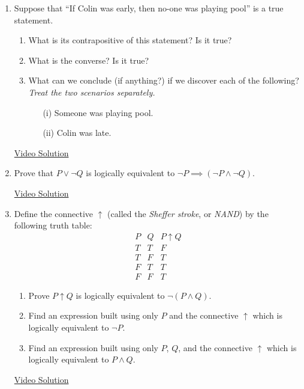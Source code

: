 \begin{enumerate}\renewcommand{\labelenumi}{\thesubsection.\theenumi} 
  \item Suppose that ``If Colin was early, then no-one was playing pool'' is a true statement.\prelistskip
		\begin{enumerate}
	  	\item What is its contrapositive of this statement? Is it true?
	  	\item What is the converse? Is it true?
	  	\item What can we conclude (if anything?) if we discover each of the following? \emph{Treat the two scenarios separately.}
			\begin{enumerate}
	  	  \item[(i)] Someone was playing pool.
	      \item[(ii)] Colin was late.
			\end{enumerate}
		\end{enumerate}
		
		\href{https://youtu.be/BI_M1-OoMac}{Video Solution}
  
  \item Prove that $P \lor \neg Q$ is logically equivalent to $\neg P \implies (\neg P \land \neg Q)$.
  
  \href{https://youtu.be/NrbdGXAP6Ug}{Video Solution}
  
  \item Define the connective $\uparrow$ (called the \emph{Sheffer stroke}, or \emph{NAND}) by the following truth table:
  \[
  \begin{array}{cc|c}
P & Q & P \uparrow Q\\\hline
T & T & F\\
T & F & T\\
F & T & T\\
F & F & T
\end{array}
  \]
  \begin{enumerate}
      \item Prove $P \uparrow Q$ is logically equivalent to $\neg (P \land Q)$. 
      \item Find an expression built using only $P$ and the connective $\uparrow$ which is logically equivalent to $\neg P$.
      \item Find an expression built using only $P$, $Q$, and the connective $\uparrow$ which is logically equivalent to $P \land Q$.
  \end{enumerate}
  
  \href{https://youtu.be/bxYgvuXtcTM}{Video Solution}
  
\end{enumerate}

